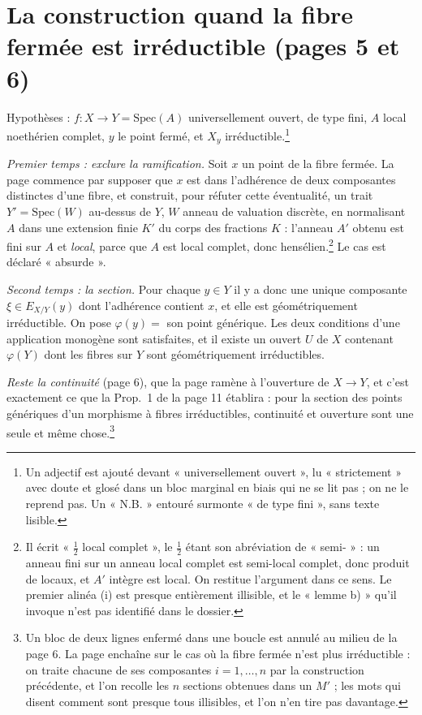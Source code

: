 \documentclass[11pt,a4paper]{article}
\begin{document}
\section*{La construction quand la fibre fermée est irréductible (pages 5 et 6)}

Hypothèses : $f : X \to Y = \mathrm{Spec}(A)$ universellement ouvert, de type
fini, $A$ local noethérien complet, $y$ le point fermé, et $X_y$
irréductible.\footnote{Un adjectif est ajouté devant « universellement
ouvert », lu « strictement » avec doute et glosé dans un bloc marginal en biais
qui ne se lit pas ; on ne le reprend pas. Un « N.B. » entouré surmonte « de
type fini », sans texte lisible.}

\emph{Premier temps : exclure la ramification.} Soit $x$ un point de la fibre
fermée. La page commence par supposer que $x$ est dans l'adhérence de deux
composantes distinctes d'une fibre, et construit, pour réfuter cette
éventualité, un trait $Y' = \mathrm{Spec}(W)$ au-dessus de $Y$, $W$ anneau de
valuation discrète, en normalisant $A$ dans une extension finie $K'$ du corps
des fractions $K$ : l'anneau $A'$ obtenu est fini sur $A$ et \emph{local}, parce
que $A$ est local complet, donc hensélien.\footnote{Il écrit « $\frac{1}{2}$
local complet », le $\frac{1}{2}$ étant son abréviation de « semi- » : un
anneau fini sur un anneau local complet est semi-local complet, donc produit de
locaux, et $A'$ intègre est local. On restitue l'argument dans ce sens. Le
premier alinéa (i) est presque entièrement illisible, et le « lemme b) » qu'il
invoque n'est pas identifié dans le dossier.} Le cas est déclaré « absurde ».

\emph{Second temps : la section.} Pour chaque $y \in Y$ il y a donc une unique
composante $\xi \in E_{X/Y}(y)$ dont l'adhérence contient $x$, et elle est
géométriquement irréductible. On pose $\varphi(y) = $ son point générique. Les
deux conditions d'une application monogène sont satisfaites, et il existe un
ouvert $U$ de $X$ contenant $\varphi(Y)$ dont les fibres sur $Y$ sont
géométriquement irréductibles.

\emph{Reste la continuité} (page 6), que la page ramène à l'ouverture de
$X \to Y$, et c'est exactement ce que la Prop.~1 de la page 11 établira :
pour la section des points génériques d'un morphisme à fibres irréductibles,
continuité et ouverture sont une seule et même chose.\footnote{Un bloc de
deux lignes enfermé dans une boucle est annulé au milieu de la page 6. La page
enchaîne sur le cas où la fibre fermée n'est plus irréductible : on traite
chacune de ses composantes $i = 1, \ldots, n$ par la construction précédente,
et l'on recolle les $n$ sections obtenues dans un $M'$ ; les mots qui disent
comment sont presque tous illisibles, et l'on n'en tire pas davantage.}
\end{document}

